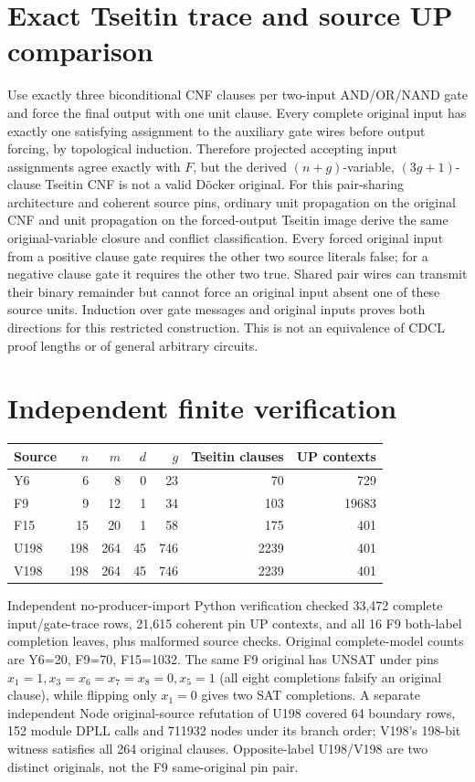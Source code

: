 \documentclass[11pt]{article}
\begin{document}
\section{Exact Tseitin trace and source UP comparison}
Use exactly three biconditional CNF clauses per two-input AND/OR/NAND gate and force the final output with one unit clause. Every complete original input has exactly one satisfying assignment to the auxiliary gate wires before output forcing, by topological induction. Therefore projected accepting input assignments agree exactly with $F$, but the derived $(n+g)$-variable, $(3g+1)$-clause Tseitin CNF is not a valid D\"ocker original. For this pair-sharing architecture and coherent source pins, ordinary unit propagation on the original CNF and unit propagation on the forced-output Tseitin image derive the same original-variable closure and conflict classification. Every forced original input from a positive clause gate requires the other two source literals false; for a negative clause gate it requires the other two true. Shared pair wires can transmit their binary remainder but cannot force an original input absent one of these source units. Induction over gate messages and original inputs proves both directions for this restricted construction. This is not an equivalence of CDCL proof lengths or of general arbitrary circuits.

\section{Independent finite verification}
\begin{center}\begin{tabular}{lrrrrrr}\toprule Source & $n$ & $m$ & $d$ & $g$ & Tseitin clauses & UP contexts\\\midrule
Y6 &6&8&0&23&70&729\\
F9 &9&12&1&34&103&19683\\
F15 &15&20&1&58&175&401\\
U198 &198&264&45&746&2239&401\\
V198 &198&264&45&746&2239&401\\\bottomrule
\end{tabular}\end{center}
Independent no-producer-import Python verification checked 33,472 complete input/gate-trace rows, 21,615 coherent pin UP contexts, and all 16 F9 both-label completion leaves, plus malformed source checks. Original complete-model counts are Y6=20, F9=70, F15=1032. The same F9 original has UNSAT under pins $x_1=1,x_3=x_6=x_7=x_8=0,x_5=1$ (all eight completions falsify an original clause), while flipping only $x_1=0$ gives two SAT completions. A separate independent Node original-source refutation of U198 covered 64 boundary rows, 152 module DPLL calls and 711932 nodes under its branch order; V198's 198-bit witness satisfies all 264 original clauses. Opposite-label U198/V198 are two distinct originals, not the F9 same-original pin pair.
\end{document}
